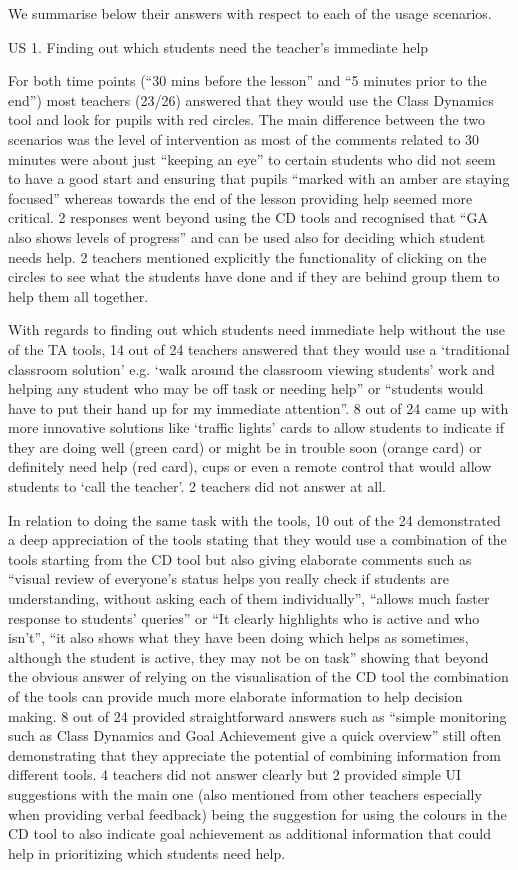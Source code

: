 We summarise below their answers with respect to each of the usage scenarios.

US 1. Finding out which students need the teacher’s immediate help
 
For both time points (“30 mins before the lesson” and “5 minutes prior
to the end”) most teachers (23/26) answered that they would use the
Class Dynamics tool and look for pupils with red circles. The main
difference between the two scenarios was the level of intervention as
most of the comments related to 30 minutes were about just “keeping an
eye” to certain students who did not seem to have a good start and
ensuring that pupils “marked with an amber are staying focused”
whereas towards the end of the lesson providing help seemed more
critical. 2 responses went beyond using the CD tools and recognised
that “GA also shows levels of progress” and can be used also for
deciding which student needs help. 2 teachers mentioned explicitly the
functionality of clicking on the circles to see what the students have
done and if they are behind group them to help them all together. 
 
With regards to finding out which students need immediate help without
the use of the TA tools, 14 out of 24 teachers answered that they
would use a ‘traditional classroom solution’ e.g. ‘walk around the
classroom viewing students’ work and helping any student who may be
off task or needing help” or “students would have to put their hand up
for my immediate attention”. 8 out of 24 came up with more innovative
solutions like ‘traffic lights’ cards to allow students to indicate if
they are doing well (green card) or might be in trouble soon (orange
card) or definitely need help (red card), cups or even a remote
control that would allow students to ‘call the teacher’. 2 teachers
did not answer at all.

In relation to doing the same task with the tools, 10 out of the 24
demonstrated a deep appreciation of the tools stating that they would
use a combination of the tools starting from the CD tool but also
giving elaborate comments such as “visual review of everyone’s status
helps you really check if students are understanding, without asking
each of them individually”, “allows much faster response to students’
queries” or “It clearly highlights who is active and who isn’t”, “it
also shows what they have been doing which helps as sometimes,
although the student is active, they may not be on task” showing that
beyond the obvious answer of relying on the visualisation of the CD
tool the combination of the tools can provide much more elaborate
information to help decision making. 8 out of 24 provided straightforward answers such as “simple monitoring such as Class Dynamics and Goal Achievement give a quick overview” still often demonstrating that they appreciate the potential of combining information from different tools. 4 teachers did not answer clearly but 2 provided simple UI suggestions with the main one (also mentioned from other teachers especially when providing verbal feedback) being the suggestion for using the colours in the CD tool to also indicate goal achievement as additional information that could help in prioritizing which students need help. 
 
